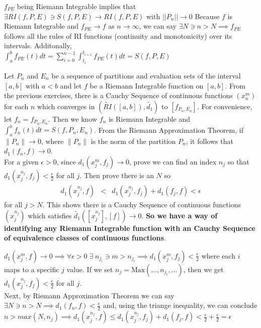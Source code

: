 \documentclass[11pt]{SelfArxOneColBMN}
\begin{document}
\begin{solution}
	$f_{PE}$ being Riemann Integrable implies that $\exists RI(f,P,E) \ni S(f,P,E) \rightarrow RI(f,P,E)$ with $||P_n|| \rightarrow 0$ Because $f$ is Riemann Integrable and $f_{PE} \rightarrow f$ as $n \rightarrow \infty$, we can say $\exists N \ni n>N \implies f_{PE}$ follows all the rules of RI functions (continuity and monotonicity) over its intervals. Additonally,\\
	$\int_a^b f_{PE}(t) dt = \sum_{i = 0}^{n -1} \int_{t_i}^{t_{i+ 1}}f_{PE}(t)dt = S(f,P,E)$
\end{solution}

\begin{exercise}
Let $P_n$ and $E_n$ be a sequence of partitions and evaluation sets
of the interval $[a,b]$ with $a < b$ and let $f$ be a Riemann Integrable function
on $[a,b]$.  From the previous exercises, there is a Cauchy Sequence of
continuous functions $(x_n^m)$ for each $n$ which converges in 
$(\widetilde{RI}([a,b]), \widetilde{d_1})$ to $[f_{P_n,E_n}]$.
For convenience, let $f_n = f_{P_n,E_n}$.  Then we know
$f_n$ is Riemann Integrable and $\int_a^b f_n(t) dt = S(f,P_n,E_n)$.
From the Riemann Approximation Theorem, if $\| P_n\| \rightarrow 0$,
where $\| P_n\|$ is the norm of the partition $P_n$, it follows that
$d_1(f_n,f) \rightarrow 0$.  \\

\noindent
For a given $\epsilon > 0$,
since $d_1(x_j^m,f_j) \rightarrow 0$, prove we can find an index $n_j$ so that
$d_1(x_j^{n_j},f_j) < \frac{\epsilon}{2}$ for all $j$.  Then prove there is an $N$ so
\begin{eqnarray*}
d_1(x_j^{n_j},f) &<& d_1(x_j^{n_j},f_j) + d_1(f_j,f) < \epsilon
\end{eqnarray*}
\noindent
for all $j > N$.  This shows there is a Cauchy Sequence of
continuous functions $(x_j^{n_j})$ which satisfies
$\widetilde{d_1}( [x_j^{n_j}], [f] ) \rightarrow 0$.
{\bf So we have a way of identifying any Riemann Integrable
function with an Cauchy Sequence of equivalence classes
of continuous functions}.
\end{exercise}

\begin{solution}
	$d_1(x_j^m,f) \rightarrow 0 \implies \forall \epsilon > 0 \; \exists \; n_{j_i} \ni m > n_{j_i} \implies d_1(x_j^m,f_j) < \frac{\epsilon}{2}$ where each $i$ maps to a specific $j$ value. If we set $n_j = \text{Max}(...,n_{j_i},...)$, then we get $d_1(x_j^{n_j},f_j) < \frac{\epsilon}{2}$ for all $j$.\\
	Next, by Riemann Approximation Theorem we can say $\exists N  \ni n > N \implies d_1(f_n,f) < \frac{\epsilon}{2}$ and, using the triange inequality, we can conclude\\
	$n > max(N,n_j) \implies d_1(x_j^{n_j},f) \leq d_1(x_j^{n_j},f_j) + d_1(f_j,f) < \frac{\epsilon}{2} + \frac{\epsilon}{2} = \epsilon$
\end{solution}


	
\end{document}
